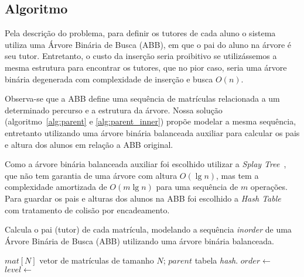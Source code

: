 \subsection{Algoritmo} \label{sec:algo}
Pela descrição do problema, para definir os tutores de cada aluno o sistema
utiliza uma Árvore Binária de Busca (ABB), em que o pai do aluno na árvore é seu
tutor. Entretanto, o custo da inserção seria proibitivo se utilizássemos a mesma
estrutura para encontrar os tutores, que no pior caso, seria uma árvore
binária degenerada com complexidade de inserção e busca $O(n)$.

Observa-se que a ABB define uma sequência de matrículas
relacionada a um determinado percurso e a estrutura da árvore. Nossa solução (algoritmo~\ref{alg:parent} e \ref{alg:parent_inner}) propõe 
modelar a mesma sequência, entretanto utilizando uma árvore binária balanceada auxiliar
para calcular os pais e altura dos alunos em relação a ABB original.

Como a árvore binária balanceada auxiliar foi escolhido utilizar a \textit{Splay Tree}~\cite{splaytree}, que não tem garantia de uma árvore com altura $O(\lg n)$, mas tem a complexidade amortizada de $O(m \lg n)$ para uma sequência de $m$ operações. Para guardar os pais e alturas dos alunos na ABB foi escolhido a \textit{Hash Table}~\cite{cormen2009hashtable} com tratamento de colisão por encadeamento.

\begin{algorithm}[ht]
  \small
  \caption{Calcula o pai (tutor) de cada matrícula, modelando a sequência \textit{inorder} de uma Árvore Binária de Busca (ABB) utilizando uma árvore binária balanceada.}
  \label{alg:parent}
  \begin{algorithmic}[1]
    \Require $mat[N]$ vetor de matrículas de tamanho $N$; $parent$ tabela \textit{hash}.
    \State $order \gets$ 
    \State $level \gets$ 

    \Statex

    \State {}
    \EndIf {}
    \Statex
    
    \State {}
    
    \EndFor
    \EndProcedure
  \end{algorithmic}
\end{algorithm}

